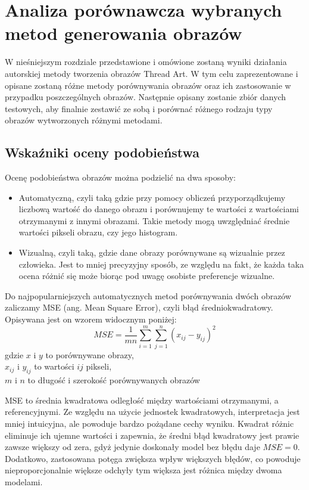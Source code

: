 \chapter{Analiza porównawcza wybranych metod generowania obrazów} \label{comp}
W nieśniejszym rozdziale przedstawione i omówione zostaną wyniki działania autorskiej metody tworzenia obrazów Thread Art. W tym celu zaprezentowane i opisane zostaną różne metody porównywania obrazów oraz ich zastosowanie w przypadku poszczególnych obrazów. Następnie opisany zostanie zbiór danych testowych, aby finalnie zestawić ze sobą i porównać różnego rodzaju typy obrazów wytworzonych różnymi metodami.
    \section{Wskaźniki oceny podobieństwa} \label{comp-methods}
    Ocenę podobieństwa obrazów można podzielić na dwa sposoby:
    \begin{itemize}
        \item Automatyczną, czyli taką gdzie przy pomocy obliczeń przyporządkujemy liczbową wartość do danego obrazu i porównujemy te wartości z wartościami otrzymanymi z innymi obrazami. Takie metody mogą uwzględniać średnie wartości pikseli obrazu, czy jego histogram.
        \item Wizualną, czyli taką, gdzie dane obrazy porównywane są wizualnie przez człowieka. Jest to mniej precyzyjny sposób, ze względu na fakt, że każda taka ocena różnić się może biorąc pod uwagę osobiste preferencje wizualne.
    \end{itemize}
    
    Do najpopularniejszych automatycznych metod porównywania dwóch obrazów zaliczamy MSE (ang. Mean Square Error), czyli błąd średniokwadratowy. Opisywana jest on wzorem widocznym poniżej:
    \begin{equation} \label{comp-methods-mse}
        MSE=\frac{1}{mn} \sum_{i=1}^m \sum_{j=1}^n (x_{ij}-y_{ij})^2
    \end{equation}
    gdzie \(x\) i \(y\) to porównywane obrazy,\\
    \(x_{ij}\) i \(y_{ij}\) to wartości \(ij\) pikseli,\\
    \(m\) i \(n\) to długość i szerokość porównywanych obrazów
    
    MSE to średnia kwadratowa odległość między wartościami otrzymanymi, a referencyjnymi. Ze względu na użycie jednostek kwadratowych, interpretacja jest mniej intuicyjna, ale powoduje bardzo pożądane cechy wyniku. Kwadrat różnic eliminuje ich ujemne wartości i zapewnia, że średni błąd kwadratowy jest prawie zawsze większy od zera, gdyż jedynie doskonały model bez błędu daje \(MSE = 0\). Dodatkowo, zastosowana potęga zwiększa wpływ większych błędów, co powoduje nieproporcjonalnie większe odchyły tym większa jest różnica między dwoma modelami. 
    
